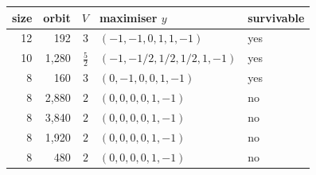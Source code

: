 \begin{tabular}{rrrll}
\toprule
size & orbit & $V$ & maximiser $y$ & survivable\\
\midrule
12 & 192 & $3$ & $(-1,-1,0,1,1,-1)$ & yes\\
10 & 1{,}280 & $\tfrac{5}{2}$ & $(-1,-1/2,1/2,1/2,1,-1)$ & yes\\
8 & 160 & $3$ & $(0,-1,0,0,1,-1)$ & yes\\
8 & 2{,}880 & $2$ & $(0,0,0,0,1,-1)$ & no\\
8 & 3{,}840 & $2$ & $(0,0,0,0,1,-1)$ & no\\
8 & 1{,}920 & $2$ & $(0,0,0,0,1,-1)$ & no\\
8 & 480 & $2$ & $(0,0,0,0,1,-1)$ & no\\
\bottomrule
\end{tabular}
